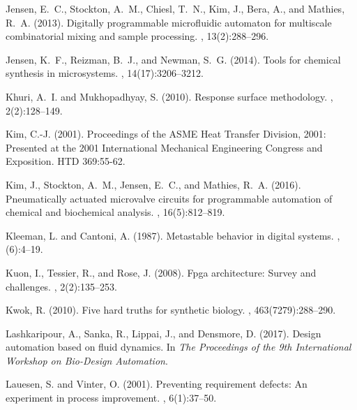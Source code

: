 \documentclass[12pt,letterpaper]{report}          %
\begin{document}
\begin{thebibliography}{}
Jensen, E.~C., Stockton, A.~M., Chiesl, T.~N., Kim, J., Bera, A., and Mathies,
  R.~A. (2013).
\newblock Digitally programmable microfluidic automaton for multiscale
  combinatorial mixing and sample processing.
, 13(2):288--296.

Jensen, K.~F., Reizman, B.~J., and Newman, S.~G. (2014).
\newblock Tools for chemical synthesis in microsystems.
, 14(17):3206--3212.

Khuri, A.~I. and Mukhopadhyay, S. (2010).
\newblock Response surface methodology.
,
  2(2):128--149.

Kim, C.-J. (2001).
\newblock Proceedings of the ASME Heat Transfer Division, 2001: Presented at the 2001 International Mechanical Engineering Congress and Exposition.  HTD 369:55-62.

Kim, J., Stockton, A.~M., Jensen, E.~C., and Mathies, R.~A. (2016).
\newblock Pneumatically actuated microvalve circuits for programmable
  automation of chemical and biochemical analysis.
, 16(5):812--819.

Kleeman, L. and Cantoni, A. (1987).
\newblock Metastable behavior in digital systems.
, (6):4--19.

Kuon, I., Tessier, R., and Rose, J. (2008).
\newblock Fpga architecture: Survey and challenges.
,
  2(2):135--253.

Kwok, R. (2010).
\newblock Five hard truths for synthetic biology.
, 463(7279):288--290.

Lashkaripour, A., Sanka, R., Lippai, J., and Densmore, D. (2017).
\newblock Design automation based on fluid dynamics.
\newblock In {\em The Proceedings of the 9th International Workshop on
  Bio-Design Automation}.

Lauesen, S. and Vinter, O. (2001).
\newblock Preventing requirement defects: An experiment in process improvement.
, 6(1):37--50.


\end{thebibliography}
\end{document}
